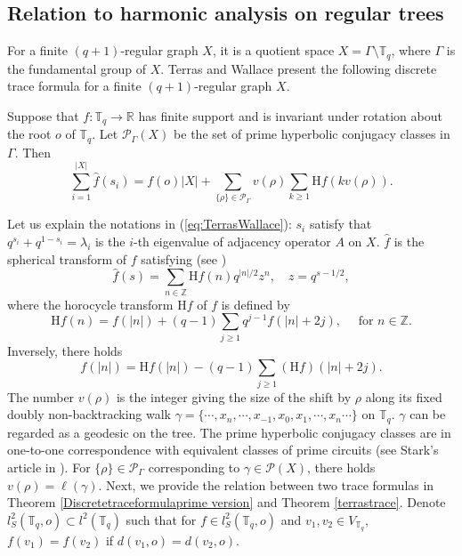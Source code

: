 \documentclass{article}
\begin{document}
\subsection{Relation to harmonic analysis on regular trees}
For a finite $(q+1)$-regular graph $X$, it is a quotient space $X = \Gamma \setminus \mathbb{T}_{q}$, where $\Gamma$ is the fundamental group of $X$. Terras and Wallace \cite{TW03} present the following discrete trace formula for a finite $(q+1)$-regular graph $X$.
\begin{theorem}\label{terrastrace}
Suppose that $f: \mathbb{T}_{q} \rightarrow \mathbb{R}$ has finite support and is invariant under rotation about the root $o$ of $\mathbb{T}_{q}$. Let $\mathcal{P}_{\Gamma}(X)$ be the set of prime hyperbolic conjugacy classes in $\Gamma$. Then
\begin{equation}\label{eq:TerrasWallace}
\sum_{i=1}^{|X|} \widehat{f}\left(s_i\right)=f(o)|X|+\sum_{\{\rho\} \in \mathcal{P}_{\Gamma}} v(\rho) \sum_{k \geq 1} \mathrm{H} f(k v(\rho)) .
\end{equation}
\end{theorem}
Let us explain the notations in (\ref{eq:TerrasWallace}): 
$s_i$ satisfy that $q^{s_{i}}+q^{1-s_{i}}=\lambda_{i}$ is the $i$-th eigenvalue of adjacency operator $A$ on $X$. $\widehat{f}$ is the spherical transform of $f$ satisfying (see \cite[Lemma 3.3]{TW03})
\begin{equation}\label{spherical}
\widehat{f}(s)=\sum_{n \in \mathbb{Z}} \mathrm{H} f(n) q^{|n| / 2} z^n, \quad z=q^{s-1/2},
\end{equation}
where the horocycle transform $\mathrm{H} f$ of $f$ is defined by
\begin{equation}\label{horo}
\mathrm{H} f(n)=f(|n|)+(q-1) \sum_{j \geq 1} q^{j-1} f(|n|+2 j), \quad \text { for } n \in \mathbb{Z}.
\end{equation}
\noindent Inversely, there holds 
\begin{equation}\label{inversehoro}
f(|n|)=\mathrm{H} f(|n|)-(q-1) \sum_{j \geq 1}(\mathrm{H} f)(|n|+2 j) .
\end{equation}
The number $v(\rho)$ is the integer giving the size of the shift by $\rho$ along its fixed doubly non-backtracking walk $\gamma=\{\cdots,x_{n},\cdots,x_{-1},x_{0},x_{1},\cdots,x_{n}\cdots\}$ on $\mathbb{T}_{q}$. $\gamma$ can be regarded as a geodesic on the tree. The prime hyperbolic conjugacy classes are in one-to-one correspondence with equivalent classes of prime circuits (see Stark’s article in \cite[pages 601-615]{HFGO12}). For $\{\rho\} \in \mathcal{P}_{\Gamma}$ corresponding to $\gamma\in \mathcal{P}(X)$, there holds $v(\rho)=\ell(\gamma)$. Next, we provide the relation between two trace formulas in Theorem \ref{Discretetraceformulaprime version} and Theorem \ref{terrastrace}. Denote $l^2_S(\mathbb{T}_q, o)\subset l^2(\mathbb{T}_q)$ such that for $f \in l^2_S(\mathbb{T}_q, o)$ and $v_1, v_2 \in V_{\mathbb{T}_q}$, $f(v_1)=f(v_2)$ if $d(v_1, o)=d(v_2, o)$.
\end{document}
